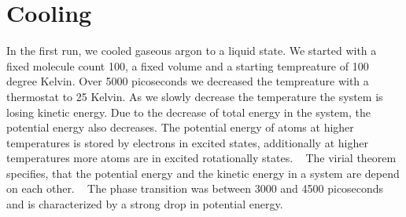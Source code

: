 \documentclass[10pt, a4paper, oneside, twocolumn]{report}
\begin{document}
\section{Cooling}

In the first run, we cooled gaseous argon to a liquid state. We started with a fixed molecule count 100, a fixed volume and a starting tempreature of 100 degree Kelvin. Over 5000 picoseconds we decreased the tempreature with a thermostat to 25 Kelvin. As we slowly decrease the temperature the system is losing kinetic energy. Due to the decrease of total energy in the system, the potential energy also decreases.
The potential energy of atoms at higher temperatures is stored by electrons in excited states, additionally at higher temperatures more atoms are in excited rotationally states. ~\cite{chemguide}
The virial theorem specifies, that the potential energy and the kinetic energy in a system are depend on each other. ~\cite{cosmos-indirekt}
The phase transition was between 3000 and 4500 picoseconds and is characterized by a strong drop in potential energy. 
\end{document}

